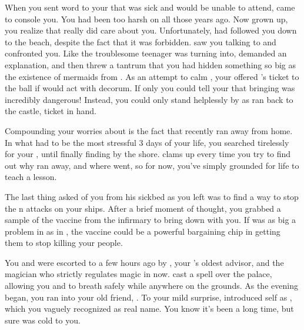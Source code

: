 \documentclass[char]{NeptuneBall}
\begin{document}
When you sent word to your \cKing{\parent} that \cEric{} was sick and would be unable to attend, \cKing{} came to console you. You had been too harsh on \cKing{\them} all those years ago. Now grown up, you realize that \cKing{} really did care about you. Unfortunately, \cWillow{} had followed you down to the beach, despite the fact that it was forbidden. \cWillow{\They} saw you talking to \cKing{} and confronted you. Like the troublesome teenager \cWillow{\they} was turning into, \cWillow{} demanded an explanation, and then threw a tantrum that you had hidden something so big as the existence of mermaids from \cWillow{\them}. As an attempt to calm \cWillow{}, your \cKing{\parent} offered \cWillow{\them} \cEric{}'s ticket to the ball if \cWillow{\they} would act with decorum. If only you could tell your \cKing{\parent} that bringing \cWillow{} was incredibly dangerous! Instead, you could only stand helplessly by as \cWillow{} ran back to the castle, ticket in hand.

Compounding your worries about \cWillow{} is the fact that \cWillow{\they} recently ran away from home. In what had to be the most stressful 3 days of your life, you searched tirelessly for your \cWillow{\offspring}, until finally finding \cWillow{\them} by the shore. \cWillow{} clams up every time you try to find out why \cWillow{\they} ran away, and where \cWillow{\they} went, so for now, you've simply grounded \cWillow{\them} for life to teach \cWillow{\them} a lesson.

The last thing \cEric{} asked of you from his sickbed as you left was to find a way to stop the \pPacifica{}n attacks on your ships. After a brief moment of thought, you grabbed a sample of the \cPolio{} vaccine from the infirmary to bring down with you. If \cPolio{} was as big a problem in \pPacifica{} as in \pAtlantis{}, the \cPolio{} vaccine could be a powerful bargaining chip in getting them to stop killing your people. 

You and \cWillow{} were escorted to \pAtlantis{} a few hours ago by \cManta{}, your \cKing{\parent}'s oldest advisor, and the magician who strictly regulates magic in \pAtlantis{} now. \cManta{} cast a spell over the palace, allowing you and \cWillow{} to breath safely while anywhere on the grounds. As the evening began, you ran into your old friend, \cPriest{}. To your mild surprise, \cPriest{\they} introduced \cPriest{\them}self as \cPriest{\MYname}, which you vaguely recognized as \cPriest{\their} real name. You know it's been a long time, but \cPriest{} sure was cold to you.
\end{document}
